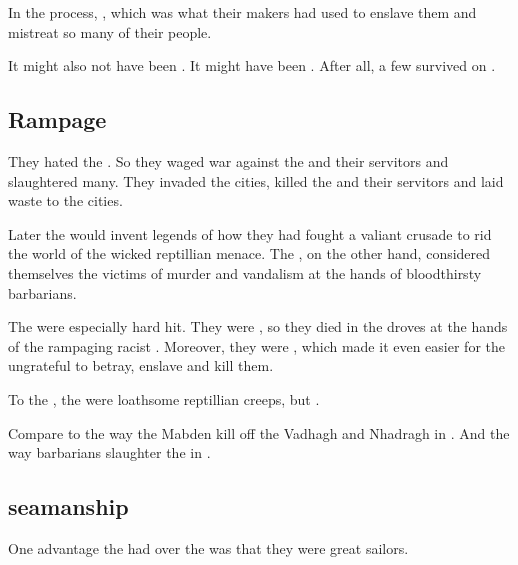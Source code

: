 In the process, , which was what their makers had used to enslave them and mistreat so many of their people. 

It might also not have been \dragons. 
It might have been . 
After all, a few \voyagers survived on \Miith{}. 









\subsection{Rampage}
They hated the . 
So they waged war against the \quiljaaran{} and their servitors and slaughtered many. 
They invaded the \quiljaaran{} cities, killed the \quiljaaran{} and their servitors and laid waste to the cities. 

Later the \aryothim{} would invent legends of how they had fought a valiant crusade to rid the world of the wicked reptillian menace. 
The \quiljaaran, on the other hand, considered themselves the victims of murder and vandalism at the hands of bloodthirsty barbarians. 

The \loculs{} were especially hard hit. 
They were , so they died in the droves at the hands of the rampaging racist \nephilim. 
Moreover, they were , which made it even easier for the ungrateful \nephilim{} to betray, enslave and kill them. 

To the \nephilim, the \loculs{} were loathsome reptillian creeps, but . 

Compare to the way the Mabden kill off the Vadhagh and Nhadragh in \cite{MichaelMoorcock:Corum}. 
And the way barbarians slaughter the  in \cite{TadWilliams:MemorySorrowandThorn}. 









\subsection[Aryoth seamanship]{\Aryoth{} seamanship}
One advantage the \aryothim{} had over the \quiljaaran{} was that they were great sailors. 

